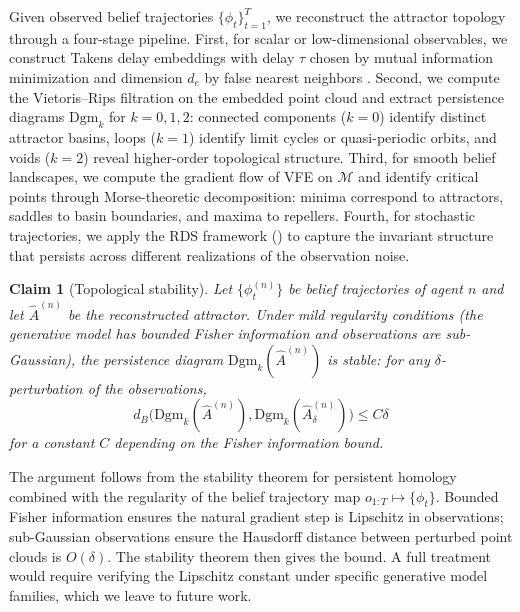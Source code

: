 \documentclass[11pt,a4paper]{article}
\newtheorem{claim}{Claim}[section]
\theoremstyle{definition}
\newcommand{\cM}{\mathcal{M}}
\begin{document}
Given observed belief trajectories $\{\phi_t\}_{t=1}^T$, we reconstruct the attractor topology through a four-stage pipeline. First, for scalar or low-dimensional observables, we construct Takens delay embeddings with delay $\tau$ chosen by mutual information minimization and dimension $d_e$ by false nearest neighbors \citep{takens1981detecting, kennel1992determining}. Second, we compute the Vietoris--Rips filtration on the embedded point cloud and extract persistence diagrams $\mathrm{Dgm}_k$ for $k = 0, 1, 2$: connected components ($k=0$) identify distinct attractor basins, loops ($k=1$) identify limit cycles or quasi-periodic orbits, and voids ($k=2$) reveal higher-order topological structure. Third, for smooth belief landscapes, we compute the gradient flow of VFE on $\cM$ and identify critical points through Morse-theoretic decomposition: minima correspond to attractors, saddles to basin boundaries, and maxima to repellers. Fourth, for stochastic trajectories, we apply the RDS framework () to capture the invariant structure that persists across different realizations of the observation noise.

\begin{claim}[Topological stability]
\label{claim:topo_stability}
Let $\{\phi_t^{(n)}\}$ be belief trajectories of agent $n$ and let $\hat{A}^{(n)}$ be the reconstructed attractor. Under mild regularity conditions (the generative model has bounded Fisher information and observations are sub-Gaussian), the persistence diagram $\mathrm{Dgm}_k(\hat{A}^{(n)})$ is stable: for any $\delta$-perturbation of the observations,
\begin{equation}
  d_B\bigl(\mathrm{Dgm}_k(\hat{A}^{(n)}), \mathrm{Dgm}_k(\hat{A}^{(n)}_\delta)\bigr) \leq C \delta
  \label{eq:topo_stability}
\end{equation}
for a constant $C$ depending on the Fisher information bound.
\end{claim}

The argument follows from the stability theorem for persistent homology \citep{cohen2007stability} combined with the regularity of the belief trajectory map $o_{1:T} \mapsto \{\phi_t\}$. Bounded Fisher information ensures the natural gradient step is Lipschitz in observations; sub-Gaussian observations ensure the Hausdorff distance between perturbed point clouds is $O(\delta)$. The stability theorem then gives the bound. A full treatment would require verifying the Lipschitz constant under specific generative model families, which we leave to future work.
\end{document}
